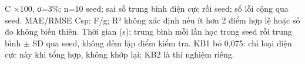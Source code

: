 \par\smallskip\noindent C ×100, σ=3\%; n=10 seed; sai số trung bình điện cực rồi seed; số lỗi cộng qua seed. MAE/RMSE Csp: F/g; R² không xác định nếu ít hơn 2 điểm hợp lệ hoặc số đo không biến thiên. Thời gian (s): trung bình mỗi lần học trong seed rồi trung bình $\pm$ SD qua seed, không đếm lặp điểm kiểm tra. KB1 bỏ 0,075: chỉ loại điện cực này khi tổng hợp, không khớp lại; KB2 là thí nghiệm riêng.\par
